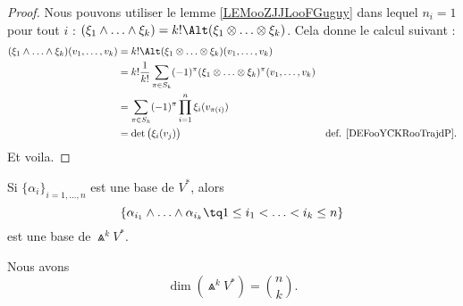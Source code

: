 \begin{proof}
	Nous pouvons utiliser le lemme \ref{LEMooZJJLooFGuguy} dans lequel \( n_i=1\) pour tout \( i\) : \( (\xi_1\wedge\ldots\wedge \xi_k)=k!\Alt(\xi_1\otimes\ldots\otimes \xi_k)\). Cela donne le calcul suivant :
	\begin{subequations}
		\begin{align}
			(\xi_1\wedge\ldots\wedge \xi_k)(v_1,\ldots,v_k) & =k!\Alt(\xi_1\otimes\ldots\otimes\xi_k)(v_1,\ldots,v_k)                                                                                   \\
			                                                & =k!\frac{1}{ k!}\sum_{\pi\in S_k}(-1)^{\pi}(\xi_1\otimes\ldots\otimes \xi_k)^{\pi}(v_1,\ldots,v_k)                                        \\
			                                                & =\sum_{\pi\in S_k}(-1)^{\pi}\prod_{i=1}^n\xi_i(v_{\pi(i)})                                                                                \\
			                                                & =\det\big( \xi_i(v_j) \big)                                                                        & \text{def. \ref{DEFooYCKRooTrajdP}.}
		\end{align}
	\end{subequations}
	Et voila.
\end{proof}

\begin{proposition}			\label{PROPooUGLOooTULnDK}
	Si \( \{ \alpha_i \}_{i=1,\ldots,n}\) est une base de \( V^*\), alors
	\begin{equation}
		\{ \alpha_{i_1}\wedge\ldots\wedge \alpha_{i_k}\tq 1\leq i_1< \ldots <i_k\leq n \}
	\end{equation}
	est une base de \( \Wedge^kV^*\).

	Nous avons
	\begin{equation}
		\dim(\Wedge^kV^*)=\binom{n}{k}.
	\end{equation}
\end{proposition}

